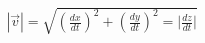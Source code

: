 \documentclass[preview]{standalone}
\begin{document}
\begin{align*}
|\vec{v}| = \sqrt{ \left( \frac{dx}{dt} \right)^2 + \left(\frac{dy}{dt}\right)^2 = \Big|\frac{dz}{dt}\Big|}
\end{align*}
\end{document}
